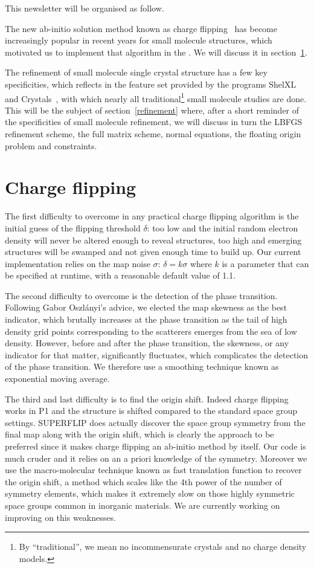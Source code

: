 \documentclass[12pt]{article}
\begin{document}
This newsletter will be organised as follow.

The new ab-initio solution method known as charge flipping~\cite{Oszlanyi:2008,Palatinus:2007} has become increasingly popular in recent years for small molecule structures, which motivated us to implement that algorithm in the \smtbx. We will discuss it in section~\ref{chargeflipping}.

The refinement of small molecule single crystal structure has a few key specificities, which reflects in the feature set provided by the programs ShelXL~\cite{Sheldrick:2008} and Crystals~\cite{Crystals:v12}, with which nearly all traditional\footnote{By ``traditional'', we mean no incommensurate crystals and no charge density models.} small molecule studies are done.
This will be the subject of section~\ref{refinement} where, after a short reminder of the specificities of small molecule refinement, we will discuss in turn the LBFGS refinement scheme, the full matrix scheme, normal equations, the floating origin problem and constraints.


\section{Charge flipping}
\label{chargeflipping}
The first difficulty to overcome in any practical charge flipping algorithm is the initial guess of the flipping threshold $\delta$: too low and the initial random electron density will never be altered enough to reveal structures, too high and emerging structures will be swamped and not given enough time to build up. Our current implementation relies on the map noise $\sigma$: $\delta = k \sigma$ where $k$ is a parameter that can be specified at runtime, with a reasonable default value of 1.1.

The second difficulty to overcome is the detection of the phase transition.  Following Gabor Oszlányi's advice, we elected the map skewness as the best indicator, which brutally increases at the phase transition as the tail of high density grid points corresponding to the scatterers emerges from the sea of low density. However, before and after the phase transition, the skewness, or any indicator for that matter, significantly fluctuates, which complicates the detection of the phase transition. We therefore use a smoothing technique known as exponential moving average.

The third and last difficulty is to find the origin shift. Indeed charge flipping works in P1 and the structure is shifted compared to the standard space group settings. SUPERFLIP does actually discover the space group symmetry from the final map along with the origin shift, which is clearly the approach to be preferred since it makes charge flipping an ab-initio method by itself. Our code is much cruder and it relies on an a priori knowledge of the symmetry. Moreover we use the macro-molecular technique known as fast translation function to recover the origin shift, a method which scales like the 4th power of the number of symmetry elements, which makes it extremely slow on those highly symmetric space groups common in inorganic materials. We are currently working on improving on this weaknesses.
\end{document}

